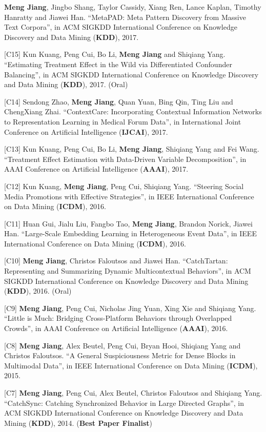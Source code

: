 \documentclass[margin, 9pt]{res}
\begin{document}
\begin{resume}
[C16] \textbf{Meng Jiang}, Jingbo Shang, Taylor Cassidy, Xiang Ren, Lance Kaplan, Timothy Hanratty and Jiawei Han. ``MetaPAD: Meta Pattern Discovery from Massive Text Corpora'', in ACM SIGKDD International Conference on Knowledge Discovery and Data Mining (\textbf{KDD}), 2017.

[C15] Kun Kuang, Peng Cui, Bo Li, \textbf{Meng Jiang} and Shiqiang Yang. ``Estimating Treatment Effect in the Wild via Differentiated Confounder Balancing'', in ACM SIGKDD International Conference on Knowledge Discovery and Data Mining (\textbf{KDD}), 2017. (Oral)

[C14] Sendong Zhao, \textbf{Meng Jiang}, Quan Yuan, Bing Qin, Ting Liu and ChengXiang Zhai. ``ContextCare: Incorporating Contextual Information Networks to Representation Learning in Medical Forum Data'', in International Joint Conference on Artificial Intelligence (\textbf{IJCAI}), 2017.

[C13] Kun Kuang, Peng Cui, Bo Li, \textbf{Meng Jiang}, Shiqiang Yang and Fei Wang. ``Treatment Effect Estimation with Data-Driven Variable Decomposition'', in AAAI Conference on Artificial Intelligence (\textbf{AAAI}), 2017.

[C12] Kun Kuang, \textbf{Meng Jiang}, Peng Cui, Shiqiang Yang. ``Steering Social Media Promotions with Effective Strategies'', in IEEE International Conference on Data Mining (\textbf{ICDM}), 2016.

[C11] Huan Gui, Jialu Liu, Fangbo Tao, \textbf{Meng Jiang}, Brandon Norick, Jiawei Han. ``Large-Scale Embedding Learning in Heterogeneous Event Data'', in IEEE International Conference on Data Mining (\textbf{ICDM}), 2016.

[C10] \textbf{Meng Jiang}, Christos Faloutsos and Jiawei Han. ``CatchTartan: Representing and Summarizing Dynamic Multicontextual Behaviors'', in ACM SIGKDD International Conference on Knowledge Discovery and Data Mining (\textbf{KDD}), 2016. (Oral)

[C9] \textbf{Meng Jiang}, Peng Cui, Nicholas Jing Yuan, Xing Xie and Shiqiang Yang. ``Little is Much: Bridging Cross-Platform Behaviors through Overlapped Crowds'', in AAAI Conference on Artificial Intelligence (\textbf{AAAI}), 2016.

[C8] \textbf{Meng Jiang}, Alex Beutel, Peng Cui, Bryan Hooi, Shiqiang Yang and Christos Faloutsos. ``A General Suspiciousness Metric for Dense Blocks in Multimodal Data'', in IEEE International Conference on Data Mining (\textbf{ICDM}), 2015.

[C7] \textbf{Meng Jiang}, Peng Cui, Alex Beutel, Christos Faloutsos and Shiqiang Yang. ``CatchSync: Catching Synchronized Behavior in Large Directed Graphs'', in ACM SIGKDD International Conference on Knowledge Discovery and Data Mining (\textbf{KDD}), 2014. (\textbf{Best Paper Finalist})


\end{resume}
\end{document}

